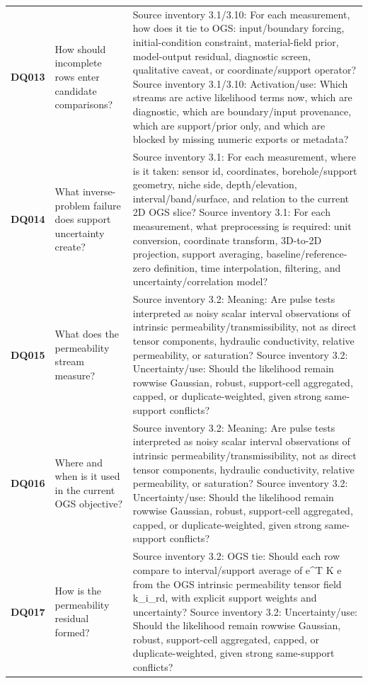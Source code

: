 \begin{longtable}{@{}L{0.09\textwidth} L{0.31\textwidth} L{0.52\textwidth}@{}}
\addlinespace[0.18em]
\textbf{DQ013} & How should incomplete rows enter candidate comparisons? & Source inventory 3.1/3.10: For each measurement, how does it tie to OGS: input/boundary forcing, initial-condition constraint, material-field prior, model-output residual, diagnostic screen, qualitative caveat, or coordinate/support operator? Source inventory 3.1/3.10: Activation/use: Which streams are active likelihood terms now, which are diagnostic, which are boundary/input provenance, which are support/prior only, and which are blocked by missing numeric exports or metadata?\\
\addlinespace[0.18em]
\textbf{DQ014} & What inverse-problem failure does support uncertainty create? & Source inventory 3.1: For each measurement, where is it taken: sensor id, coordinates, borehole/support geometry, niche side, depth/elevation, interval/band/surface, and relation to the current 2D OGS slice? Source inventory 3.1: For each measurement, what preprocessing is required: unit conversion, coordinate transform, 3D-to-2D projection, support averaging, baseline/reference-zero definition, time interpolation, filtering, and uncertainty/correlation model?\\
\addlinespace[0.18em]
\textbf{DQ015} & What does the permeability stream measure? & Source inventory 3.2: Meaning: Are pulse tests interpreted as noisy scalar interval observations of intrinsic permeability/transmissibility, not as direct tensor components, hydraulic conductivity, relative permeability, or saturation? Source inventory 3.2: Uncertainty/use: Should the likelihood remain rowwise Gaussian, robust, support-cell aggregated, capped, or duplicate-weighted, given strong same-support conflicts?\\
\addlinespace[0.18em]
\textbf{DQ016} & Where and when is it used in the current OGS objective? & Source inventory 3.2: Meaning: Are pulse tests interpreted as noisy scalar interval observations of intrinsic permeability/transmissibility, not as direct tensor components, hydraulic conductivity, relative permeability, or saturation? Source inventory 3.2: Uncertainty/use: Should the likelihood remain rowwise Gaussian, robust, support-cell aggregated, capped, or duplicate-weighted, given strong same-support conflicts?\\
\addlinespace[0.18em]
\textbf{DQ017} & How is the permeability residual formed? & Source inventory 3.2: OGS tie: Should each row compare to interval/support average of e\textasciicircum{}T K e from the OGS intrinsic permeability tensor field k\_i\_rd, with explicit support weights and uncertainty? Source inventory 3.2: Uncertainty/use: Should the likelihood remain rowwise Gaussian, robust, support-cell aggregated, capped, or duplicate-weighted, given strong same-support conflicts?\\

\end{longtable}
